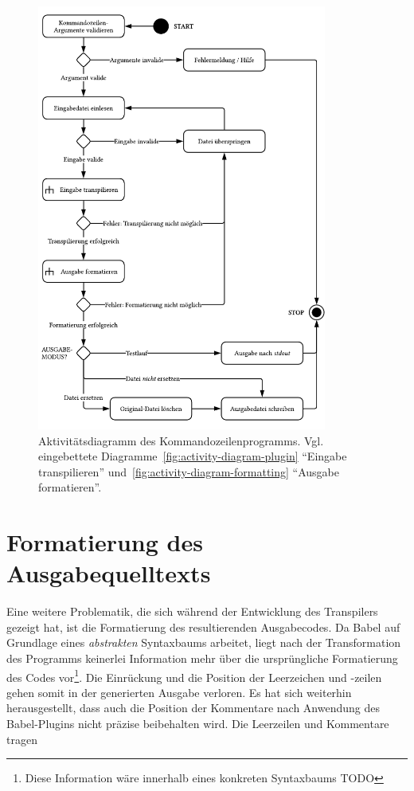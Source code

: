 \begin{figure}[tbp]
  \centering
  \includegraphics[width=0.85\textwidth]{src/4_Umsetzung/img/activity-diagram-cli.pdf}
	\caption[Aktivitätsdiagramm des Kommandozeilenprogramms]{Aktivitätsdiagramm des Kommandozeilenprogramms. Vgl. eingebettete Diagramme~\ref{fig:activity-diagram-plugin} \enquote{Eingabe transpilieren} und~\ref{fig:activity-diagram-formatting} \enquote{Ausgabe formatieren}.}
	\label{fig:activity-diagram-cli}
\end{figure}

\section{Formatierung des Ausgabequelltexts}

Eine weitere Problematik, die sich während der Entwicklung des Transpilers gezeigt hat, ist die Formatierung des resultierenden Ausgabecodes. Da Babel auf Grundlage eines \emph{abstrakten} Syntaxbaums arbeitet, liegt nach der Transformation des Programms keinerlei Information mehr über die ursprüngliche Formatierung des Codes vor\footnote{Diese Information wäre innerhalb eines konkreten Syntaxbaums TODO}. Die Einrückung und die Position der Leerzeichen und -zeilen gehen somit in der generierten Ausgabe verloren. Es hat sich weiterhin herausgestellt, dass auch die Position der Kommentare nach Anwendung des Babel-Plugins nicht präzise beibehalten wird. Die Leerzeilen und Kommentare tragen

